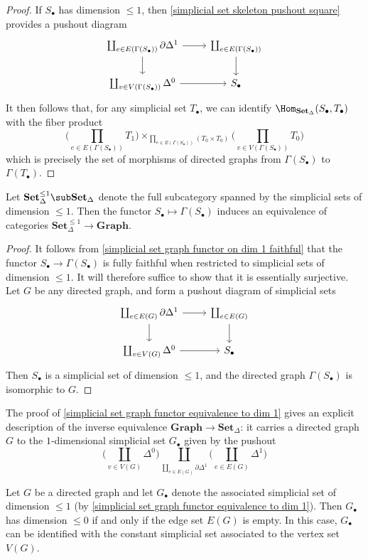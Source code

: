 \begin{proof}
If $S_\bullet$ has dimension $\leq 1$, then \cref{simplicial set skeleton pushout square} provides a pushout diagram
\[\begin{tikzcd}
\coprod_{e\in E(\Gamma(S_\bullet))}\partial\Delta^1\ar[r]\ar[d]&\coprod_{e\in E(\Gamma(S_\bullet))}\ar[d]\\
\coprod_{v\in V(\Gamma(S_\bullet))}\Delta^0\ar[r]&S_\bullet
\end{tikzcd}\]
It then follows that, for any simplicial set $T_\bullet$, we can identify $\Hom_{\mathbf{Set}_\Delta}(S_\bullet,T_\bullet)$ with the fiber product
\[\Big(\prod_{e\in E(\Gamma(S_\bullet))}T_1\Big)\times_{\prod_{e\in E(\Gamma(S_\bullet))}(T_0\times T_0)}\Big(\prod_{v\in V(\Gamma(S_\bullet))}T_0\Big)\]
which is precisely the set of morphisms of directed graphs from $\Gamma(S_\bullet)$ to $\Gamma(T_\bullet)$.
\end{proof}
\begin{proposition}\label{simplicial set graph functor equivalence to dim 1}
Let $\mathbf{Set}^{\leq 1}_{\Delta}\sub\mathbf{Set}_\Delta$ denote the full subcategory spanned by the simplicial sets of dimension $\leq 1$. Then the functor $S_\bullet\mapsto\Gamma(S_\bullet)$ induces an equivalence of categories $\mathbf{Set}_\Delta^{\leq 1}\to\mathbf{Graph}$.
\end{proposition}
\begin{proof}
It follows from \cref{simplicial set graph functor on dim 1 faithful} that the functor $S_\bullet\to\Gamma(S_\bullet)$ is fully faithful when restricted to simplicial sets of dimension $\leq 1$. It will therefore suffice to show that it is essentially surjective. Let $G$ be any directed graph, and form a pushout diagram of simplicial sets
\[\begin{tikzcd}
\coprod_{e\in E(G)}\partial\Delta^1\ar[r]\ar[d]&\coprod_{e\in E(G)}\ar[d]\\
\coprod_{v\in V(G)}\Delta^0\ar[r]&S_\bullet
\end{tikzcd}\]
Then $S_\bullet$ is a simplicial set of dimension $\leq 1$, and the directed graph $\Gamma(S_\bullet)$ is isomorphic to $G$.
\end{proof}
\begin{remark}\label{simplicial set graph functor description}
The proof of \cref{simplicial set graph functor equivalence to dim 1} gives an explicit description of the inverse equivalence $\mathbf{Graph}\to\mathbf{Set}_\Delta$: it carries a directed graph $G$ to the $1$-dimensional simplicial set $G_\bullet$ given by the pushout
\[\Big(\coprod_{v\in V(G)}\Delta^0\Big)\coprod_{\coprod_{e\in E(G)}\partial\Delta^1}\Big(\coprod_{e\in E(G)}\Delta^1\Big)\]
\end{remark}
\begin{example}
Let $G$ be a directed graph and let $G_\bullet$ denote the associated simplicial set of dimension $\leq 1$ (by \cref{simplicial set graph functor equivalence to dim 1}). Then $G_\bullet$ has dimension $\leq 0$ if and only if the edge set $E(G)$ is empty. In this case, $G_\bullet$ can be identified with the constant simplicial set associated to the vertex set $V(G)$.
\end{example}
